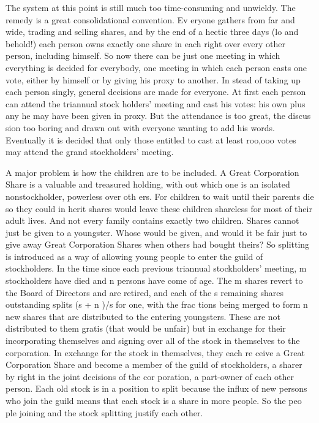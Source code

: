 \documentclass[11pt,openany]{book}
\begin{document}
The system at this point is still much too time-consuming and unwieldy. The remedy is a great consolidational convention. Ev eryone gathers from far and wide, trading and selling shares, and by the end of a hectic three days (lo and behold!) each person owns exactly one share in each right over every other person, including himself. So now there can be just one meeting in which everything is decided for everybody, one meeting in which each person casts one vote, either by himself or by giving his proxy to another. In stead of taking up each person singly, general decisions are made for everyone. At first each person can attend the triannual stock holders' meeting and cast his votes: his own plus any he may have been given in proxy. But the attendance is too great, the discus sion too boring and drawn out with everyone wanting to add his words. Eventually it is decided that only those entitled to cast at least roo,ooo votes may attend the grand stockholders' meeting. 

A major problem is how the children are to be included. A Great Corporation Share is a valuable and treasured holding, with out which one is an isolated nonstockholder, powerless over oth ers. For children to wait until their parents die so they could in herit shares would leave these children shareless for most of their adult lives. And not every family contains exactly two children. Shares cannot just be given to a youngster. Whose would be given, and would it be fair just to give away Great Corporation Shares when others had bought theirs? So splitting is introduced as a way of allowing young people to enter the guild of stockholders. In the time since each previous triannual stockholders' meeting, m stockholders have died and n persons have come of age. The m shares revert to the Board of Directors and are retired, and each of the s remaining shares outstanding splits (s + n )/s for one, with the frac tions being merged to form n new shares that are distributed to the entering youngsters. These are not distributed to them gratis (that would be unfair) but in exchange for their incorporating themselves and signing over all of the stock in themselves to the corporation. In exchange for the stock in themselves, they each re ceive a Great Corporation Share and become a member of the guild of stockholders, a sharer by right in the joint decisions of the cor poration, a part-owner of each other person. Each old stock is in a position to split because the influx of new persons who join the guild means that each stock is a share in more people. So the peo ple joining and the stock splitting justify each other. 
\end{document}
